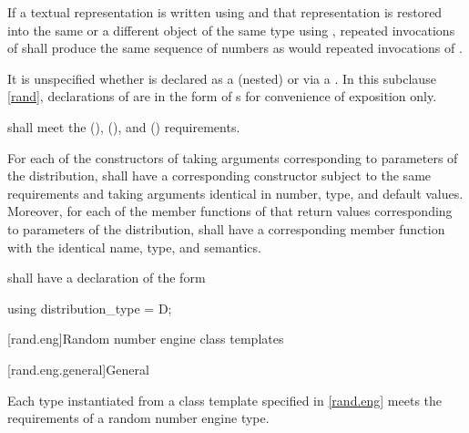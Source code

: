 \pnum
If a textual representation is written using 
and that representation is restored
into the same or a different object 
of the same type using ,
repeated invocations of 
shall produce the same sequence of numbers
as would repeated invocations of .

\pnum
It is unspecified whether 
is declared as a (nested) 
or via a .
In this subclause \ref{rand},
declarations of 
are in the form of s
for convenience of exposition only.

\pnum
{} shall meet the
 (),
 (),
and
 () requirements.

\pnum
For each of the constructors of 
taking arguments corresponding to parameters of the distribution,
 shall have a corresponding constructor
subject to the same requirements
and taking arguments identical in number, type, and default values.
Moreover,
for each of the member functions of 
that return values corresponding to parameters of the distribution,
 shall have a corresponding member function
with the identical name, type, and semantics.

\pnum
{} shall have a declaration of the form
\begin{codeblock}
using distribution_type =  D;
\end{codeblock}

%
%




[rand.eng]{Random number engine class templates}%

[rand.eng.general]{General}%

\pnum
Each type instantiated
from a class template specified in \ref{rand.eng}
meets the requirements
of a random number engine type.

